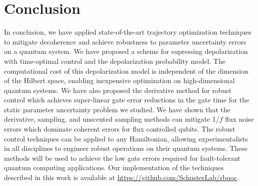 \section{Conclusion}
In conclusion, we have applied state-of-the-art trajectory
optimization techniques to mitigate decoherence and
achieve robustness to parameter uncertainty
errors on a quantum system.
We have proposed a scheme for supressing
depolarization with time-optimal
control and the depolarization probability model.
The computational cost of this depolarization model is
independent of the dimension of the Hilbert space, enabling
inexpensive optimization on high-dimensional quantum systems.
We have also proposed the derivative method for robust control which achieves
super-linear gate error reductions in the gate time for the static parameter
uncertainty problem we studied.
We have shown that the derivative, sampling, and unscented sampling methods
can mitigate 1/$f$ flux noise errors
which dominate coherent errors for flux controlled qubits.
The robust control techniques can be applied
to any Hamiltonian,
allowing experimentalists in all disciplines to engineer robust
operations on their quantum systems.
These methods will be used to achieve the low gate errors
required for fault-tolerant quantum computing applications. Our
implementation of the techniques described in this work is available
at \url{https://github.com/SchusterLab/rbqoc}.
